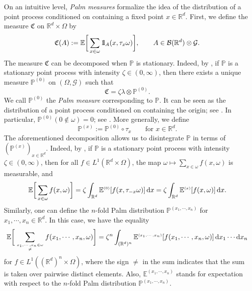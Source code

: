 \documentclass[11pt]{article}
\renewcommand{\d}{{\rm d}}
\newcommand{\R}{\mathbb R}
\newcommand{\E}{\mathbb E}
\renewcommand{\P}{\mathbb P}
\def\1{{\mathchoice
{1\mskip-4mu\mathrm l}
{1\mskip-4mu\mathrm l}
{1\mskip-4.5mu\mathrm l}
{1\mskip-5mu\mathrm l}}}
\newcommand{\heap}[2]{\genfrac{}{}{0pt}{}{#1}{#2}}
\newcommand{\ssup}[1]{{\scriptscriptstyle({#1})}}
\theoremstyle{rem}
\begin{document}
On an intuitive level, {\it Palm measures} formalize the idea of the
distribution of a point process conditioned on containing a fixed point
$x\in \R^d$. First, we define the measure $\mathfrak{C}$ on
$\R^d\times \Omega$ by
\begin{equation}\label{eq:camp-meas-def}
  \mathfrak{C}(A):=\E\bigg[\sum_{x\in
    \omega}\1_A(x,\tau_x\omega)\bigg],
  \qquad
  A\in \mathcal{B}(\R^d)\otimes \mathcal{G}.
\end{equation}
The measure $\mathfrak{C}$ can be decomposed when $\P$ is stationary. Indeed,
by \cite[Theorem 3.3.1]{SW08}, if $\P$ is a stationary point process with
intensity $\zeta\in (0,\infty)$, then there exists a unique measure
$\P^{\ssup 0}$ on $(\Omega,\mathcal{G})$ such that
\begin{equation}\label{eq:palm-decomp}
\mathfrak{C}=\zeta \lambda\otimes \P^{\ssup 0}.
\end{equation}
We call $\P^{\ssup 0}$ the \textit{Palm measure} corresponding to $\P$. It can
be seen as the distribution of a point process conditioned on containing the
origin; see \cite[Proposition 9.5]{LP18}. In particular,
$\P^{\ssup 0}(0\notin \omega)=0$; see \cite[Eq. (9.7)]{LP18}. More generally,
we define
\[
\P^{\ssup x}:=\P^{\ssup 0}\circ \tau_x\qquad
\mbox{for } x\in \R^d.
\]
The aforementioned decomposition allows us to disintegrate $\P$ in terms of
$(\P^{\ssup x})_{x\in \R^d}$. Indeed, by \cite[Theorem 3.3.3]{SW08}, if $\P$ is
a stationary point process with intensity $\zeta\in (0,\infty)$, then for all
$f\in L^1(\R^d\times \Omega)$, the map
$\omega\mapsto \sum_{x\in \omega}f(x,\omega)$ is measurable, and
\begin{equation}\label{eq:refined-camp-decomp}
  \E\bigg[ \sum_{x\in \omega}f(x,\omega)\bigg]
  =
  \zeta\int_{\R^d}\E^{\ssup 0}[f(x,\tau_{-x}\omega)]\,\d x
  =
  \zeta \int_{\R^d}\E^{\ssup x}[f(x,\omega)]\,\d x.
\end{equation}
Similarly, one can define the $n$-fold Palm distribution
$\P^{\ssup{x_1,\cdots,x_n}}$ for $x_1,\cdots, x_n\in \R^d$. In this case, we
have the equality
\begin{equation}\label{eq:multidim-campbell-eq}
  \E\bigg[
  \sum_{\heap{x_1,\cdots,x_n\in \omega}{\neq}}
  f(x_1,\cdots,x_n,\omega)\bigg]
  =
  \zeta^n\int_{(\R^d)^n}
  \E^{\ssup{x_1,\cdots,x_n}}[f(x_1,\cdots,x_n,\omega)]
  \,\d x_1\cdots \d x_n
\end{equation}
for $f\in L^1((\R^d)^n\times \Omega)$, where the sign $\neq$ in the sum
indicates that the sum is taken over pairwise distinct elements. Also,
$\E^{\ssup{x_1,\cdots,x_n}}$ stands for expectation with respect to the
$n$-fold Palm distribution $\P^{\ssup{x_1,\cdots,x_n}}$.
\end{document}
